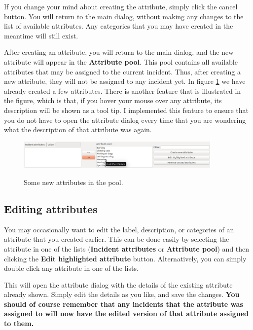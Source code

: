 \documentclass{memoir}
\begin{document}
If you change your mind about creating the attribute, simply click the cancel button. You will return to the main dialog, without making any changes to the list of available attributes. Any categories that you may have created in the meantime will still exist. 

After creating an attribute, you will return to the main dialog, and the new attribute will appear in the \textbf{Attribute pool}. This pool contains all available attributes that may be assigned to the current incident. Thus, after creating a new attribute, they will not be assigned to any incident yet. In figure \ref{fig:attributepool} we have already created a few attributes. There is another feature that is illustrated in the figure, which is that, if you hover your mouse over any attribute, its description will be shown as a tool tip. I implemented this feature to ensure that you do not have to open the attribute dialog every time that you are wondering what the description of that attribute was again.

\begin{figure}[h!]
  \centering
  \caption{Some new attributes in the pool.}
  \includegraphics[width=100mm]{Screenshot_9.pdf}
  \label{fig:attributepool}
\end{figure}


\subsection{Editing attributes}
\label{sec:editingattributes}

You may occasionally want to edit the label, description, or categories of an attribute that you created earlier. This can be done easily by selecting the attribute in one of the lists (\textbf{Incident attributes} or \textbf{Attribute pool}) and then clicking the \textbf{Edit highlighted attribute} button. Alternatively, you can simply double click any attribute in one of the lists.

This will open the attribute dialog with the details of the existing attribute already shown. Simply edit the details as you like, and save the changes. \textbf{You should of course remember that any incidents that the attribute was assigned to will now have the edited version of that attribute assigned to them.}
\end{document}
